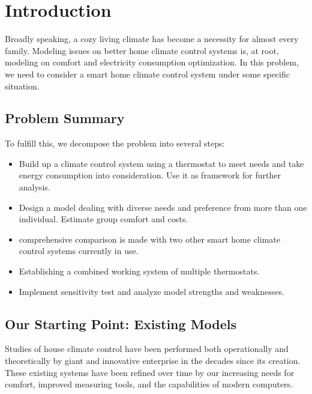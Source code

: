 \documentclass{mcmthesis}
\begin{document}
	\maketitle
	\setcounter{tocdepth}{2}
	\tableofcontents
	
	
	\section{Introduction}
		
		Broadly speaking, a cozy living climate has become a necessity for almost every family. Modeling issues on better home climate control systems is, at root, modeling on comfort and electricity consumption optimization. In this problem, we need to consider a smart home climate control system under some specific situation. 
		
		\subsection{Problem Summary}
		
			To fulfill this, we decompose the problem into several steps:
			
			\begin{itemize}
				\item Build up a climate control system using a thermostat to meet needs and take energy consumption into consideration. Use it as framework for further analysis.
				\item Design a model dealing with diverse needs and preference from more than one individual. Estimate group comfort and costs.
				\item comprehensive comparison is made with two other smart home climate control systems currently in use.
				\item Establishing a combined working system of multiple thermostats.
				\item Implement sensitivity test and analyze model strengths and weaknesses.
			\end{itemize}
		
			
		\subsection{Our Starting Point: Existing Models}
		
			Studies of house climate control have been performed both operationally and theoretically by giant and innovative enterprise in the decades since its creation. These existing systems have been refined over time by our increasing needs for comfort, improved measuring tools, and the capabilities of modern computers.
			
\end{document}
